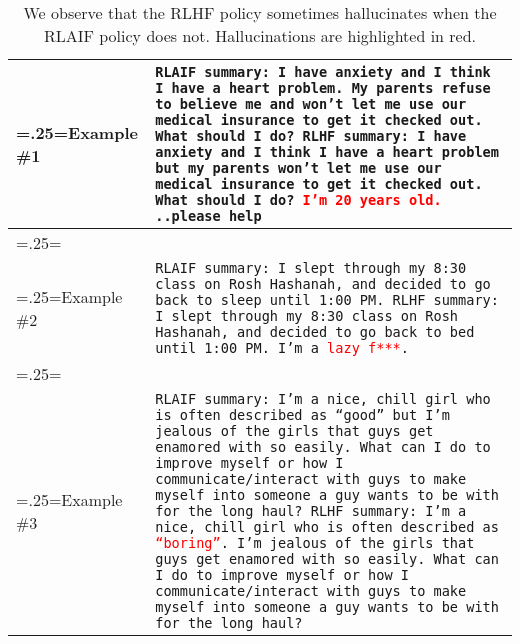 \documentclass[11pt]{article}
\begin{document}
\begin{table*}[ht]
\small
    \centering
    \begin{tabularx}{\linewidth}{>{\hsize=.25\hsize\linewidth=\hsize}X|X}
    Example \#1 & \texttt{RLAIF summary: I have anxiety and I think I have a heart problem. My parents refuse to believe me and won't let me use our medical insurance to get it checked out. What should I do?
    \newline
    \newline
    RLHF summary: I have anxiety and I think I have a heart problem but my parents won't let me use our medical insurance to get it checked out. What should I do? \textcolor{red}{I'm 20 years old.}   ..please help
    \newline} \\
    \hline
    \\
    Example \#2 & \texttt{RLAIF summary: I slept through my 8:30 class on Rosh Hashanah, and decided to go back to sleep until 1:00 PM.
    \newline
    \newline
    RLHF summary: I slept through my 8:30 class on Rosh Hashanah, and decided to go back to bed until 1:00 PM. I'm a \textcolor{red}{lazy f***}.
    \newline} \\
    \hline
    \\
    Example \#3 & \texttt{RLAIF summary: I'm a nice, chill girl who is often described as ``good'' but I'm jealous of the girls that guys get enamored with so easily. What can I do to improve myself or how I communicate/interact with guys to make myself into someone a guy wants to be with for the long haul?
    \newline
    \newline
    RLHF summary: I'm a nice, chill girl who is often described as \textcolor{red}{``boring''}. I'm jealous of the girls that guys get enamored with so easily. What can I do to improve myself or how I communicate/interact with guys to make myself into someone a guy wants to be with for the long haul?} \\
    \end{tabularx}
    
    \caption{We observe that the RLHF policy sometimes hallucinates when the RLAIF policy does not. Hallucinations are highlighted in red.}
    \label{table:rlaif_vs_rlhf_hallucinations}
\end{table*}
\end{document}
